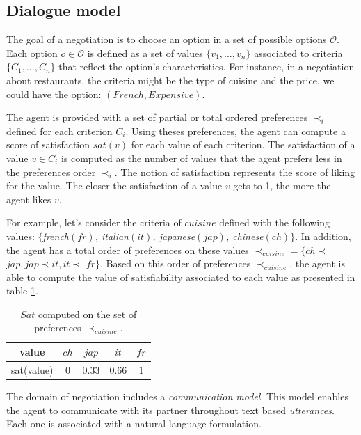 \documentclass[conference, letterpaper]{IEEEtran}
\begin{document}
	
	\subsection{Dialogue model}
	
	\label{sec:dialogue-model}
	
	The goal of a negotiation is to choose an option in a set of possible options $\mathcal{O}$. Each option $o\in\mathcal{O}$ is defined as a set of values $\{v_1, ..., v_n\}$ associated to criteria $\{C_1, ..., C_n\}$ that reflect the option's characteristics.  
	For instance, in a negotiation about restaurants, the criteria might be the type of cuisine and the price, we could have the option: $(French,Expensive)$.
	
	The agent is provided with a set of partial or total ordered preferences $\prec_i$ defined for each criterion $C_i$. Using theses preferences, the agent can compute a score of satisfaction $sat(v)$ for each value of each criterion. The satisfaction of a value $v \in C_i$ is computed as the number of values that the agent prefers less in the preferences order $\prec_i$. The notion of satisfaction represents the score of liking for the value. The closer the satisfaction of a value $v$ gets to 1, the more the agent likes $v$.
	 
	 
	For example, let's consider the criteria of $cuisine$ defined with the following values: $\{$\emph{french$(fr)$, italian$(it)$, japanese$(jap)$, chinese$(ch)$}$\}$. In addition, the agent has a total order of preferences on these values $\prec_{cuisine}$$=\{ch$$\prec$$jap, jap$$\prec$$it, it$$\prec$ $fr\}$. Based on this order of preferences $\prec_{cuisine}$, the agent is able to compute the value of satisfiability associated to each value as presented in table \ref{tab:sat}.
	
	\begin{table} [h]
		\centering
				\large
		\begin{tabular}{ |c|c|c|c|c| }
		\hline
		value & $ch$ & $jap$ & $it$ & $fr$ \\	
		\hline
		sat(value) & 0 & 0.33 & 0.66 & 1 \\
		\hline
	\end{tabular}
		\caption{$Sat$ computed on the set of preferences $\prec_{cuisine}$.}
		\label{tab:sat}

	\end{table}


	
	The domain of negotiation includes a \emph{communication model}. This model enables the agent to communicate with its partner throughout text based \textit{utterances}. 
	Each one is associated with a natural language formulation.%
	
\end{document}

